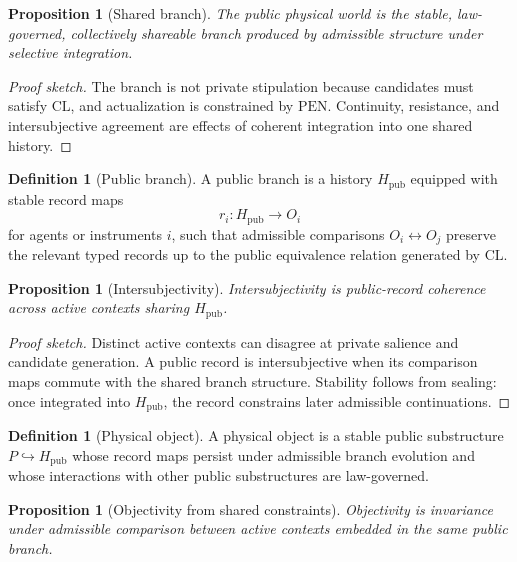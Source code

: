 \documentclass[11pt]{article}
\theoremstyle{plain}
\newtheorem{proposition}[theorem]{Proposition}
\theoremstyle{definition}
\newtheorem{definition}[theorem]{Definition}
\theoremstyle{remark}
\newenvironment{proofsketch}{\begin{proof}[Proof sketch]}{\end{proof}}
\newcommand{\CL}{\mathrm{CL}}
\newcommand{\PEN}{\mathrm{PEN}}
\begin{document}
\begin{proposition}[Shared branch]
The public physical world is the stable, law-governed, collectively shareable branch produced by admissible structure under selective integration.
\end{proposition}

\begin{proofsketch}
The branch is not private stipulation because candidates must satisfy \(\CL\), and actualization is constrained by \(\PEN\). Continuity, resistance, and intersubjective agreement are effects of coherent integration into one shared history.
\end{proofsketch}

\begin{definition}[Public branch]
A public branch is a history \(H_{\mathrm{pub}}\) equipped with stable record maps
\[
r_i:H_{\mathrm{pub}}\to O_i
\]
for agents or instruments \(i\), such that admissible comparisons \(O_i\leftrightarrow O_j\) preserve the relevant typed records up to the public equivalence relation generated by \(\CL\).
\end{definition}

\begin{proposition}[Intersubjectivity]
Intersubjectivity is public-record coherence across active contexts sharing \(H_{\mathrm{pub}}\).
\end{proposition}

\begin{proofsketch}
Distinct active contexts can disagree at private salience and candidate generation. A public record is intersubjective when its comparison maps commute with the shared branch structure. Stability follows from sealing: once integrated into \(H_{\mathrm{pub}}\), the record constrains later admissible continuations.
\end{proofsketch}

\begin{definition}[Physical object]
A physical object is a stable public substructure \(P\hookrightarrow H_{\mathrm{pub}}\) whose record maps persist under admissible branch evolution and whose interactions with other public substructures are law-governed.
\end{definition}

\begin{proposition}[Objectivity from shared constraints]
Objectivity is invariance under admissible comparison between active contexts embedded in the same public branch.
\end{proposition}
\end{document}
